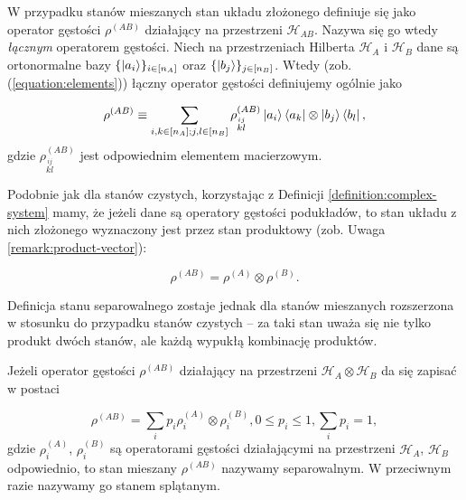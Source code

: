 W przypadku stanów mieszanych stan układu złożonego definiuje się jako operator gęstości $\rho ^ {(AB)}$ działający na przestrzeni $\mathcal{H}_{AB}$. Nazywa się go wtedy \textit{łącznym} operatorem gęstości. Niech na przestrzeniach Hilberta $\mathcal{H}_{A}$ i $\mathcal{H}_{B}$ dane są ortonormalne bazy $\{\ket{a_{i}}\}_{i \in [n_{A}]}$ oraz $\{\ket{b_{j}}\}_{j \in [n_{B}]}$. Wtedy (zob. (\ref{equation:elements})) łączny operator gęstości definiujemy ogólnie jako

\begin{equation}
    \label{equation:complexmixed}
    \rho ^ {(AB)} \equiv \sum\limits_{i, k \in [n_{A}]; j, l \in [n_{B}]} \rho_{\stackrel{ij}{kl}} ^ {(AB)} \ket{a_{i}} \bra{a_{k}} \otimes \ket{b_{j}} \bra{b_{l}},
\end{equation}
gdzie $\rho_{\stackrel{ij}{kl}} ^ {(AB)}$ jest odpowiednim elementem macierzowym.

Podobnie jak dla stanów czystych, korzystając z Definicji \ref{definition:complex-system} mamy, że jeżeli dane są operatory gęstości podukładów, to stan układu z nich złożonego wyznaczony jest przez stan produktowy (zob. Uwaga \ref{remark:product-vector}):

\begin{equation}
    \label{equation:mixedproduct}
    \rho ^ {(AB)} = \rho ^ {(A)} \otimes \rho ^ {(B)}.
\end{equation}

Definicja stanu separowalnego zostaje jednak dla stanów mieszanych rozszerzona w stosunku do przypadku stanów czystych -- za taki stan uważa się nie tylko produkt dwóch stanów, ale każdą wypukłą kombinację produktów.

\begin{definition}
    Jeżeli operator gęstości $\rho ^ {(AB)}$ działający na przestrzeni $\mathcal{H}_A \otimes \mathcal{H}_B$ da się zapisać w postaci 

    \begin{equation}
        \label{equation:separable}
        \rho ^ {(AB)} = \sum\limits_{i} p_{i} \rho_{i} ^ {(A)} \otimes \rho_{i} ^ {(B)}, 0 \leq p_i \leq 1, \sum\limits_{i} p_i = 1,
    \end{equation}
    gdzie $\rho_{i} ^ {(A)}$, $\rho_{i} ^ {(B)}$ są operatorami gęstości działającymi na przestrzeni $\mathcal{H}_A$, $\mathcal{H}_B$ odpowiednio, to stan mieszany $\rho^{(AB)}$ nazywamy separowalnym. W przeciwnym razie nazywamy go stanem splątanym.
\end{definition}
